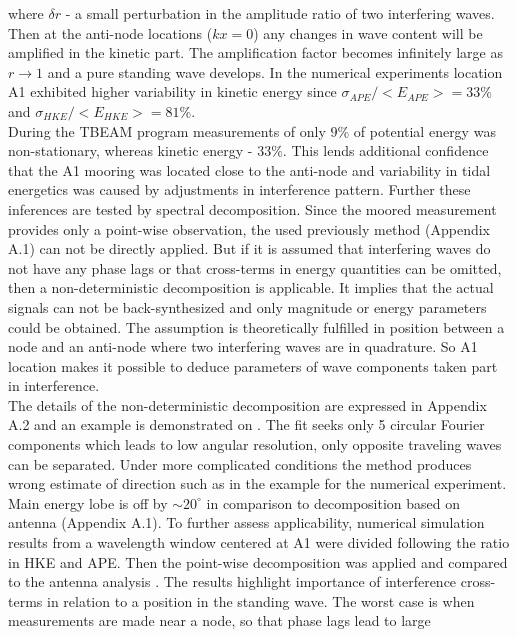 \documentclass[12pt]{article}
\begin{document}
where $\delta r$ - a small perturbation in the amplitude ratio of two interfering waves. Then at 
the anti-node locations ($kx = 0$) any changes in wave content will be amplified in the kinetic 
part. The amplification factor becomes infinitely large as $r \rightarrow 1$ and a pure standing 
wave develops. In the numerical experiments location A1 exhibited higher variability in kinetic 
energy since $\sigma_{APE}/<E_{APE}> = 33\%$ and $\sigma_{HKE}/<E_{HKE}> = 81\%$.\\
During the TBEAM program measurements of only $9\%$ of potential energy was non-stationary, whereas 
kinetic energy - $33\%$. This lends additional confidence that the A1 mooring was located 
close to the anti-node and variability in tidal energetics was caused by adjustments in 
interference pattern. Further these inferences are tested by spectral decomposition. Since the 
moored measurement provides only a point-wise observation, the used previously method (Appendix A.1) can 
not be directly applied. But if it is assumed that interfering waves do not have any phase lags or 
that cross-terms in energy quantities can be omitted, then a non-deterministic decomposition is 
applicable. It implies that the actual signals can not be back-synthesized and only magnitude or 
energy parameters could be obtained. The assumption is theoretically fulfilled in position between 
a node and an anti-node where two interfering waves are in quadrature. So A1 location makes it 
possible to deduce parameters of wave components taken part in interference.\\
The details of the non-deterministic decomposition are expressed in Appendix A.2 and an example 
is demonstrated on . The fit seeks only 5 circular Fourier components 
which leads to low angular resolution, only opposite traveling waves can be separated. Under more 
complicated conditions the method produces wrong estimate of direction such as in the example for the numerical 
experiment. Main energy lobe is off by $\sim 20^{\circ}$ in comparison to decomposition based on 
antenna 
(Appendix A.1). To further assess applicability, numerical simulation results from a wavelength 
window centered at A1 were divided following the ratio in HKE and APE. Then the point-wise 
decomposition was applied and compared to the antenna analysis . The 
results highlight importance of interference cross-terms in relation to a position in the standing 
wave. The worst case is when measurements are made near a node, so that phase lags lead to large 
\end{document}
